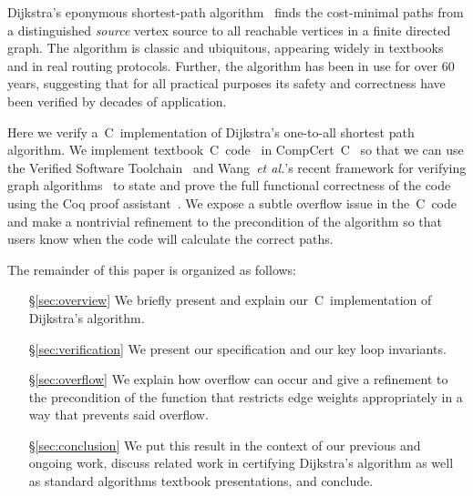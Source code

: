 Dijkstra's eponymous shortest-path algorithm~\cite{DBLP:journals/nm/Dijkstra59} finds
the cost-minimal paths from a distinguished \emph{source} vertex
source to all reachable vertices in a finite directed graph.
The algorithm is classic and ubiquitous, appearing widely in textbooks~\cite{clrs}
and in real routing protocols. Further, the algorithm has been in
use for over $60$ years, suggesting that for all practical purposes
its safety and correctness have been verified by decades of application.


Here we verify a~C~implementation of Dijkstra's one-to-all shortest path algorithm. 
We implement textbook~C~code~\cite{clrs} in CompCert~C~\cite{leroy:compcert} so that
we can use the Verified Software Toolchain~\cite{appel:programlogics} and 
Wang~\emph{et al.}'s recent framework for verifying graph algorithms~\cite{DBLP:journals/pacmpl/WangCMH19} to state and prove the full functional 
correctness of the code using the Coq proof assistant~\cite{coq}.  
We expose a subtle overflow issue in the~C~code and make a nontrivial refinement to the precondition of the algorithm so that users know when the code will calculate the correct paths.

The remainder of this paper is organized as follows:
\begin{itemize}
    \item[\S\ref{sec:overview}] We briefly present and explain
    our~C~implementation of Dijkstra's algorithm.
    \item[\S\ref{sec:verification}] We present our specification
    and our key loop invariants.
    \item[\S\ref{sec:overflow}] We explain how overflow can occur and give a 
    refinement to the precondition of the function that restricts edge weights
    appropriately in a way that prevents said overflow.
    \item[\S\ref{sec:conclusion}] We put this result in the context of our
    previous and ongoing work, discuss related work in certifying Dijkstra's algorithm
    as well as standard algorithms textbook presentations, and conclude.
\end{itemize} 